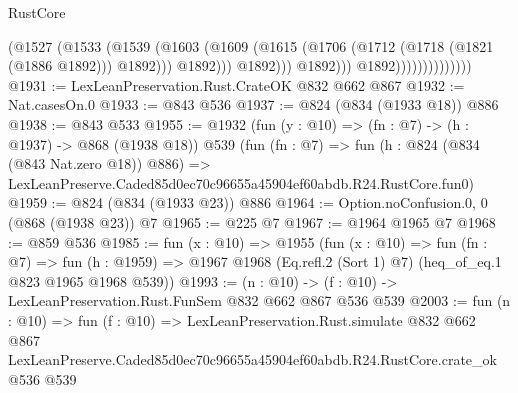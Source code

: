 \begin{lexlean}{RustCore}
\begin{coremodule}
                                        (@1527
                                          (@1533
                                            (@1539
                                              (@1603
                                                (@1609
                                                  (@1615
                                                    (@1706
                                                      (@1712 (@1718 (@1821 (@1886 @1892))) @1892)))
                                                  @1892)))
                                            @1892)))
                                      @1892)))
                                @1892))))))))))))))
@1931 := LexLeanPreservation.Rust.CrateOK @832 @662 @867
@1932 := Nat.casesOn.{0}
@1933 := @843 @536
@1937 := @824 (@834 (@1933 @18)) @886
@1938 := @843 @533
@1955 := @1932
    (fun (y : @10) => (fn : @7) -> (h : @1937) -> @868 (@1938 @18))
    @539
    (fun (fn : @7) =>
    fun (h : @824 (@834 (@843 Nat.zero @18)) @886) =>
    LexLeanPreserve.Caded85d0ec70c96655a45904ef60abdb.R24.RustCore.fun0)
@1959 := @824 (@834 (@1933 @23)) @886
@1964 := Option.noConfusion.{0, 0} (@868 (@1938 @23)) @7
@1965 := @225 @7
@1967 := @1964 @1965 @7
@1968 := @859 @536
@1985 := fun (x : @10) =>
  @1955
    (fun (x : @10) =>
    fun (fn : @7) =>
    fun (h : @1959) => @1967 @1968 (Eq.refl.{2} (Sort 1) @7) (heq_of_eq.{1} @823 @1965 @1968 @539))
@1993 := (n : @10) -> (f : @10) -> LexLeanPreservation.Rust.FunSem @832 @662 @867 @536 @539
@2003 := fun (n : @10) =>
  fun (f : @10) =>
  LexLeanPreservation.Rust.simulate
    @832
    @662
    @867
    LexLeanPreserve.Caded85d0ec70c96655a45904ef60abdb.R24.RustCore.crate_ok
    @536
    @539
\end{coremodule}
\end{lexlean}
